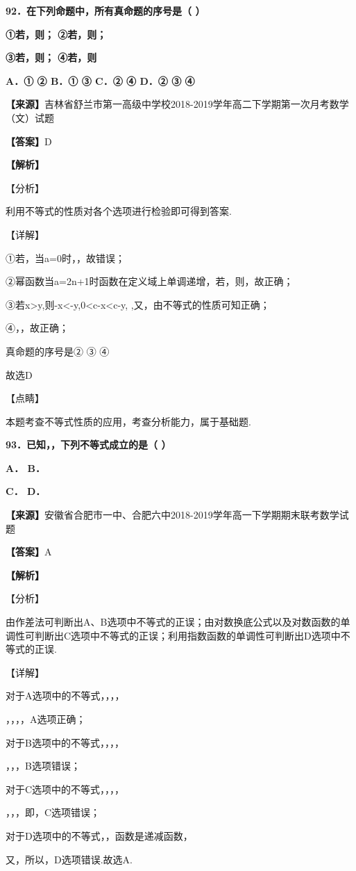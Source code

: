 \textbf{92．在下列命题中，所有真命题的序号是（ ）}

\textbf{①若，则； ②若，则；}

\textbf{③若，则； ④若，则}

\textbf{A．① ② B．① ③ C．② ④ D．② ③ ④}

\textbf{【来源】}吉林省舒兰市第一高级中学校2018-2019学年高二下学期第一次月考数学（文）试题

\textbf{【答案】}D

\textbf{【解析】}

【分析】

利用不等式的性质对各个选项进行检验即可得到答案.

【详解】

①若，当a=0时，，故错误；

②幂函数当a=2n+1时函数在定义域上单调递增，若，则，故正确；

③若x\textgreater y,则-x\textless-y,0\textless c-x\textless c-y,
,又，由不等式的性质可知正确；

④，，故正确；

真命题的序号是② ③ ④

故选D

【点睛】

本题考查不等式性质的应用，考查分析能力，属于基础题.

\textbf{93．已知，，下列不等式成立的是（ ）}

\textbf{A． B．}

\textbf{C． D．}

\textbf{【来源】}安徽省合肥市一中、合肥六中2018-2019学年高一下学期期末联考数学试题

\textbf{【答案】}A

\textbf{【解析】}

【分析】

由作差法可判断出A、B选项中不等式的正误；由对数换底公式以及对数函数的单调性可判断出C选项中不等式的正误；利用指数函数的单调性可判断出D选项中不等式的正误.

【详解】

对于A选项中的不等式，，，，

，，，，A选项正确；

对于B选项中的不等式，，，，

，，，B选项错误；

对于C选项中的不等式，，，，

，，，即，C选项错误；

对于D选项中的不等式，，函数是递减函数，

又，所以，D选项错误.故选A.

